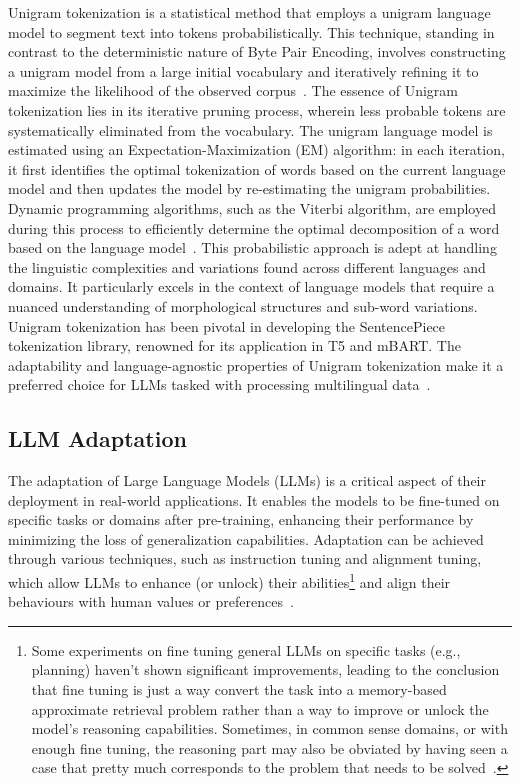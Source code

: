 Unigram tokenization is a statistical method that employs a unigram language model to segment text into tokens probabilistically.
This technique, standing in contrast to the deterministic nature of Byte Pair Encoding, involves constructing a unigram model from a large initial vocabulary and iteratively refining it to maximize the likelihood of the observed corpus~\cite{kudo2018sentencepiece}.
The essence of Unigram tokenization lies in its iterative pruning process, wherein less probable tokens are systematically eliminated from the vocabulary.
The unigram language model is estimated using an Expectation-Maximization (EM) algorithm: in each iteration, it first identifies the optimal tokenization of words based on the current language model and then updates the model by re-estimating the unigram probabilities.
Dynamic programming algorithms, such as the Viterbi algorithm, are employed during this process to efficiently determine the optimal decomposition of a word based on the language model~\cite{survey}.
This probabilistic approach is adept at handling the linguistic complexities and variations found across different languages and domains.
It particularly excels in the context of language models that require a nuanced understanding of morphological structures and sub-word variations.
Unigram tokenization has been pivotal in developing the SentencePiece~\cite{kudo2018sentencepiece} tokenization library, renowned for its application in T5 and mBART\@.
The adaptability and language-agnostic properties of Unigram tokenization make it a preferred choice for LLMs tasked with processing multilingual data~\cite{kudo2018sentencepiece}.

\subsection{LLM Adaptation}
\label{sec:adaptation-of-llms}

The adaptation of Large Language Models (LLMs) is a critical aspect of their deployment in real-world applications.
It enables the models to be fine-tuned on specific tasks or domains after pre-training, enhancing their performance by minimizing the loss of generalization capabilities.
Adaptation can be achieved through various techniques, such as instruction tuning and alignment tuning, which allow LLMs to enhance (or unlock) their abilities\footnote{
	Some experiments on fine tuning general LLMs on specific tasks (e.g., planning) haven't shown significant improvements, leading to the conclusion that fine tuning is just a way convert the task into a memory-based approximate retrieval problem rather than a way to improve or unlock the model's reasoning capabilities. Sometimes, in common sense domains, or with enough fine tuning, the reasoning part may also be obviated by having seen a case that pretty much corresponds to the problem that needs to be solved~\cite{subbarao2024canlanguagemodelsreasonplan}.
} and align their behaviours with human values or preferences~\cite{survey}.

